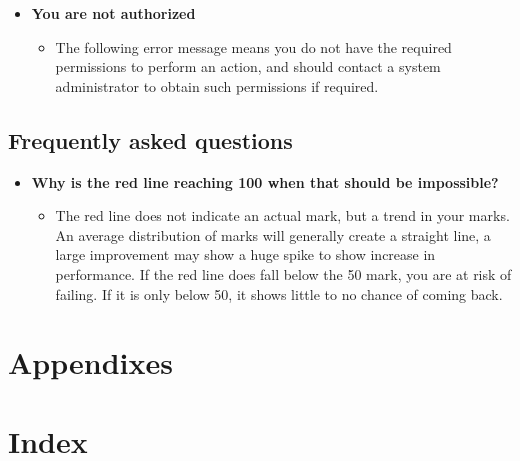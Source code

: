 \documentclass[a4paper,12pt]{article}
\begin{document}
	    \begin{itemize}
	    	\item \textbf{You are not authorized}
	    	\begin{itemize}
	    		\item The following error message means you do not have the required permissions to perform an action, and should contact a system administrator to obtain such permissions if required.
	    	\end{itemize}
	    \end{itemize}
	    
	    \subsection{Frequently asked questions}
	    
	    \begin{itemize}
	    	\item \textbf{Why is the red line reaching 100 when that should be impossible?}
	    		\begin{itemize}
	    			\item The red line does not indicate an actual mark, but a trend in your marks. An average distribution of marks will generally create a straight line, a large improvement may show a huge spike to show increase in performance. If the red line does fall below the 50 mark, you are at risk of failing. If it is only below 50, it shows little to no chance of coming back.
	    		\end{itemize}
	    \end{itemize}
	 
	\pagebreak
	 
    \section{Appendixes}
    
    \section{Index}
    
    \pagebreak  
\end{document}
